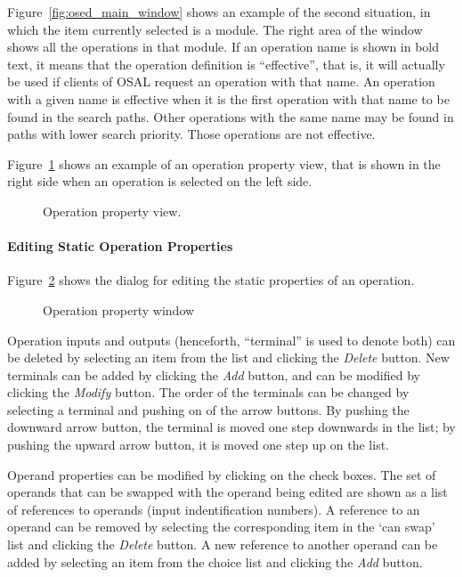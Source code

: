 \documentclass[a4paper,twoside]{tceusermanual}
\begin{document}
Figure~\ref{fig:osed_main_window} shows an example of the second situation, in
which the item currently selected is a module. The right area of the window
shows all the operations in that module. If an operation name is shown in
bold text, it means that the operation definition is ``effective'', that is,
it will actually be used if clients of OSAL request an operation with that
name. An operation with a given name is effective when it is the first
operation with that name to be found in the search paths. Other operations
with the same name may be found in paths with lower search priority. Those
operations are not effective.

Figure~\ref{fig:osed_operation_property_view} shows an example of an operation 
property view, that is shown in the right side when an operation is selected 
on the left side.

\begin{figure}[tb]
\centerline{}
\caption{Operation property view.}
\label{fig:osed_operation_property_view}
\end{figure}

\paragraph{Editing Static Operation Properties}

Figure~\ref{fig:osed_operation_window} shows the dialog for editing the
static properties of an operation. 
 
\begin{figure}[tb]
\centerline{}
\caption{Operation property window}
\label{fig:osed_operation_window}
\end{figure}

Operation inputs and outputs (henceforth, ``terminal'' is used to denote both)
can be deleted by selecting an item from the list and clicking the \emph{Delete}
button. New terminals can be added
by clicking the \emph{Add} button, and can be modified by clicking the \emph{Modify}
button. The order of the terminals can be changed by selecting a terminal
and pushing on of the arrow buttons. By pushing the downward arrow button, the
terminal is moved one step downwards in the list; by pushing the upward arrow
button, it is moved one step up on the list.

Operand properties can be modified by clicking on the check boxes. The set
of operands that can be swapped with the operand being edited are shown as a
list of references to operands (input indentification numbers).  A reference
to an operand can be removed by selecting the corresponding item in the `can
swap' list and clicking the \emph{Delete} button.  A new reference to another
operand can be added by selecting an item from the choice list and clicking
the \emph{Add} button.
\end{document}
